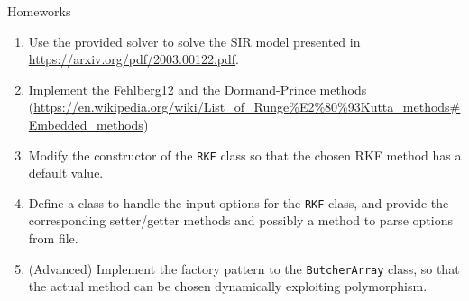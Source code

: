 \documentclass[10pt]{beamer}
\begin{document}
\begin{frame}{Homeworks}
\begin{enumerate}
\item Use the provided solver to solve the SIR model presented in \url{https://arxiv.org/pdf/2003.00122.pdf}.
\item Implement the Fehlberg12 and the Dormand-Prince methods (\url{https://en.wikipedia.org/wiki/List_of_Runge\%E2\%80\%93Kutta_methods\#Embedded_methods})
\item Modify the constructor of the \texttt{RKF} class so that the chosen RKF method has a default value.

\item Define a class to handle the input options for the \texttt{RKF} class, and provide the corresponding setter/getter methods and possibly a method to parse options from file.

\item (Advanced) Implement the factory pattern to the \texttt{ButcherArray} class, so that the actual method can be chosen dynamically exploiting polymorphism.
\end{enumerate}
\end{frame}
\end{document}
